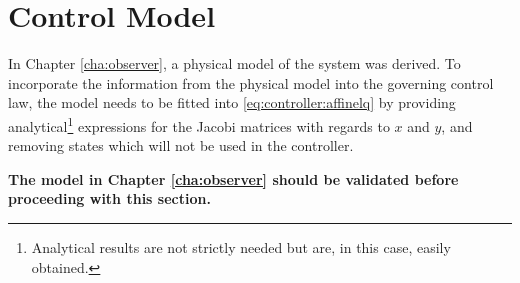 \section{Control Model}
\label{sec:controller:model}
    In Chapter \ref{cha:observer}, a physical model of the system
    was derived. To incorporate the information from the physical model
    into the governing control law, the model needs to be fitted into
    \eqref{eq:controller:affinelq} by providing analytical\footnote{Analytical results are not strictly needed but are, in this case, easily obtained.}
    expressions for the Jacobi matrices with regards to $x$ and $y$,
    and removing states which will not be used in the controller.

    \textbf{The model in Chapter \ref{cha:observer} should be validated before
    proceeding with this section.}
